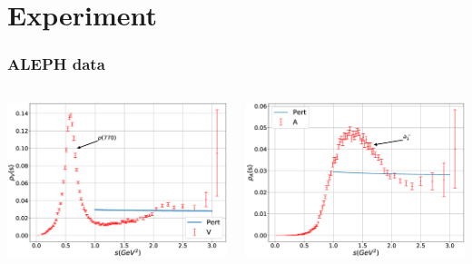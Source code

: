 \documentclass[fleqn]{beamer}
\begin{document}
\section{Experiment}
\begin{frame}
  \frametitle{ALEPH data}
  \begin{columns}{\textwidth}
    \begin{column}{0.5\textwidth}
      \includegraphics[width=\textwidth]{./images/specFuncAleph_V.eps}
    \end{column}
    \begin{column}{0.5\textwidth}
      \includegraphics[width=\textwidth]{./images/specFuncAleph_A.eps}
    \end{column}
  \end{columns}
\end{frame}
\end{document}
